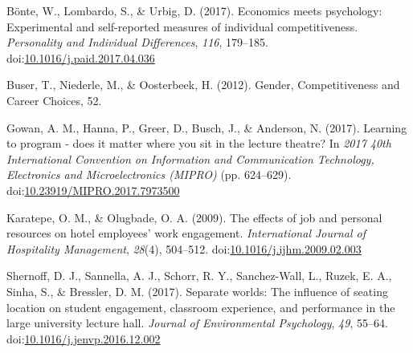 \documentclass[man]{apa6}
\begin{document}
\begingroup
\setlength{\parindent}{-0.5in}
\setlength{\leftskip}{0.5in}

\hypertarget{refs}{}
\leavevmode\hypertarget{ref-bonte_economics_2017}{}%
Bönte, W., Lombardo, S., \& Urbig, D. (2017). Economics meets psychology: Experimental and self-reported measures of individual competitiveness. \emph{Personality and Individual Differences}, \emph{116}, 179--185. doi:\href{https://doi.org/10.1016/j.paid.2017.04.036}{10.1016/j.paid.2017.04.036}

\leavevmode\hypertarget{ref-buser_gender_2012}{}%
Buser, T., Niederle, M., \& Oosterbeek, H. (2012). Gender, Competitiveness and Career Choices, 52.

\leavevmode\hypertarget{ref-gowan_learning_2017}{}%
Gowan, A. M., Hanna, P., Greer, D., Busch, J., \& Anderson, N. (2017). Learning to program - does it matter where you sit in the lecture theatre? In \emph{2017 40th International Convention on Information and Communication Technology, Electronics and Microelectronics (MIPRO)} (pp. 624--629). doi:\href{https://doi.org/10.23919/MIPRO.2017.7973500}{10.23919/MIPRO.2017.7973500}

\leavevmode\hypertarget{ref-karatepe_effects_2009}{}%
Karatepe, O. M., \& Olugbade, O. A. (2009). The effects of job and personal resources on hotel employees' work engagement. \emph{International Journal of Hospitality Management}, \emph{28}(4), 504--512. doi:\href{https://doi.org/10.1016/j.ijhm.2009.02.003}{10.1016/j.ijhm.2009.02.003}

\leavevmode\hypertarget{ref-shernoff_separate_2017}{}%
Shernoff, D. J., Sannella, A. J., Schorr, R. Y., Sanchez-Wall, L., Ruzek, E. A., Sinha, S., \& Bressler, D. M. (2017). Separate worlds: The influence of seating location on student engagement, classroom experience, and performance in the large university lecture hall. \emph{Journal of Environmental Psychology}, \emph{49}, 55--64. doi:\href{https://doi.org/10.1016/j.jenvp.2016.12.002}{10.1016/j.jenvp.2016.12.002}

\endgroup
\end{document}
